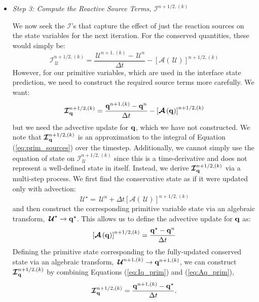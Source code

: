 \documentclass[linenumbers]{aastex631}
\newcommand{\Ic}{{\boldsymbol{\mathcal{I}}}}
\newcommand{\Uc}{{\,\bm{\mathcal{U}}}}
\newcommand{\qb}{{\bf q}}
\newcommand{\Adv}[1]{{\left [\boldsymbol{\mathcal{A}} \left(#1\right)\right]}}
\begin{document}
\begin{itemize}
\begin{itemize}
  \item {\em Step 3: Compute the Reactive Source Terms, $\Ic^{n+1/2,(k)}$}

    We now seek the $\Ic$'s that capture the effect of just the
    reaction sources on the state variables for the next iteration.
    For the conserved quantities, these would simply be:
    \begin{equation}
      \Ic^{n+1/2,(k)}_{\Uc} = \frac{\Uc^{n+1,(k)} - \Uc^n}{\Delta t} - \Adv{\Uc}^{n+1/2,(k)}
    \end{equation}
    However, for our primitive variables, which are used in the
    interface state prediction, we need to construct the required source terms more
    carefully.  We want:
    \begin{equation}
      \Ic^{n+1/2,(k)}_{\qb} = \frac{\qb^{n+1,(k)} - \qb^n}{\Delta t} - \Adv{\qb}^{n+1/2,(k)}\label{eq:Iq_prim}
    \end{equation}
    but we need the advective update for $\qb$, which we have not
    constructed.  We note that $\Ic^{n+1/2,(k)}_\qb$ is an approximation to the integral of
    Equation (\ref{eq:prim_sources}) over the timestep.  Additionally, we cannot simply use the equation of
    state on $\Ic^{n+1/2,(k)}_{\Uc}$ since this is a time-derivative and
    does not represent a well-defined state in itself.  Instead, we
    derive $\Ic^{n+1/2,(k)}_{\qb}$ via a multi-step process.  We first find
    the conservative state as if it were updated only with advection:
    \begin{equation}
      \Uc^\star = \Uc^n + \Delta t \Adv{\Uc}^{n+1/2,(k)}
    \end{equation}
    and then construct the corresponding primitive variable state via an algebraic transform,
    $\Uc^\star \rightarrow \qb^\star$.
    This allows us to define the advective update for $\qb$ as:
    \begin{equation}
      \Adv{\qb}^{n+1/2,(k)} = \frac{\qb^\star - \qb^n}{\Delta t}\label{eq:Aq_prim}
    \end{equation}
    Defining the primitive state corresponding to the fully-updated
    conserved state via an algebraic transform, $\Uc^{n+1,(k)}
    \rightarrow \qb^{n+1,(k)}$, we can construct $\Ic^{n+1/2,(k)}_{\qb}$ by
    combining Equations (\ref{eq:Iq_prim}) and (\ref{eq:Aq_prim}),
    \begin{equation}
      \Ic^{n+1/2,(k)}_{\qb} = \frac{\qb^{n+1,(k)} - \qb^\star}{\Delta t}.
    \end{equation}





  \end{itemize}

\end{itemize}
\end{document}
